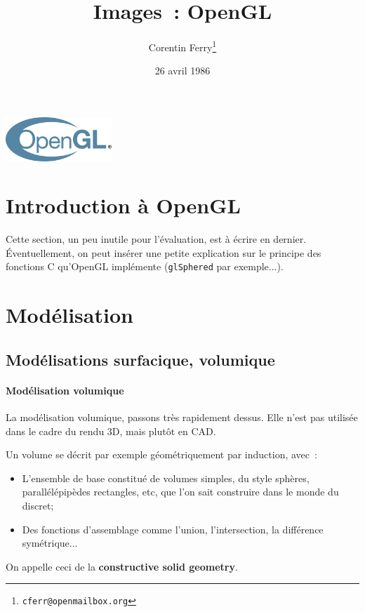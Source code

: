 \documentclass[a4paper, 10pt]{article}
\title{Images~: OpenGL}
\date{26 avril 1986}
\author{Corentin Ferry\footnote{\texttt{cferr@openmailbox.org}}}
\newcommand{\code}[1]{\texttt{#1}}
\begin{document}
\maketitle

\begin{center}
\includegraphics[width=4cm]{images/OpenGL_logo}
\end{center}

\tableofcontents

\section{Introduction à OpenGL}

Cette section, un peu inutile pour l'évaluation, est à écrire en dernier. 
Éventuellement, on peut insérer une petite explication sur le principe des
fonctions C qu'OpenGL implémente (\code{glSphered} par exemple...).

\section{Modélisation}
\subsection{Modélisations surfacique, volumique}

\paragraph{Modélisation volumique}
La modélisation volumique, passons très rapidement dessus. Elle n'est pas 
utilisée dans le cadre du rendu 3D, mais plutôt en CAD. 

Un volume se décrit par exemple géométriquement par induction, avec~:
\begin{itemize}
    \item L'ensemble de base constitué de volumes simples, du style sphères,
    parallélépipèdes rectangles, etc, que l'on sait construire dans le monde
    du discret;
    \item Des fonctions d'assemblage comme l'union, l'intersection, la 
    différence symétrique...
\end{itemize}

On appelle ceci de la \textbf{constructive solid geometry}.
\end{document}
